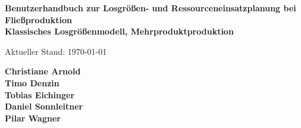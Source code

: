 \documentclass[12pt,a4paper, listof=entryprefix, bibliography=totocnumbered,toc=listofnumbered,lof=listofnumbered]{scrartcl}
\newcounter{verzeichnis}
\begin{document}
\onehalfspacing	

\begin{center}

	\vspace*{4cm} %
	\Large
	\textbf{Benutzerhandbuch zur Losgrößen- und Ressourceneinsatzplanung bei Fließproduktion}\\ %
	\large
	\textbf{Klassisches Losgrößenmodell, Mehrproduktproduktion}\\ %
		
	\vspace*{8cm} %
	\normalsize
	\begin{center}
	Aktueller Stand: \today 
	
	\textbf{Christiane Arnold\\Timo Denzin\\Tobias Eichinger\\Daniel Sonnleitner\\Pilar Wagner} %
	
	\end{center}
\end{center}
\pagebreak

\singlespacing %
\setcounter{section}{0}
\setcounter{page}{1}

\tableofcontents %
\pagebreak

\onehalfspacing %
\renewcommand{\thesection}{\arabic{section}} %
\setcounter{page}{1}	%
\setcounter{section}{0}
\renewcommand{\sectionmark}[1]{\markright{#1}} %
\renewcommand{\subsectionmark}[1]{}            %
\renewcommand{\subsubsectionmark}[1]{}         %
\rhead{\rightmark}                             %
\end{document}
